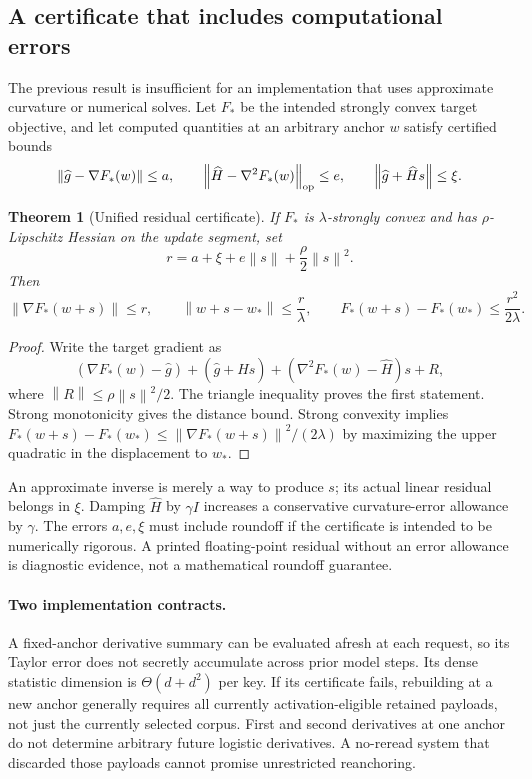 \documentclass[11pt,a4paper]{article}
\newtheorem{theorem}{Theorem}[section]
\theoremstyle{definition}\newtheorem{definition}[theorem]{Definition}
\newcommand{\norm}[1]{\left\lVert #1\right\rVert}
\begin{document}
\subsection{A certificate that includes computational errors}
The previous result is insufficient for an implementation that uses approximate curvature or numerical solves. Let $F_*$ be the intended strongly convex target objective, and let computed quantities at an arbitrary anchor $w$ satisfy certified bounds
\[
 \norm{\widehat g-\nabla F_*(w)}\le a,\qquad
 \norm{\widehat H-\nabla^2F_*(w)}_{\rm op}\le e,\qquad
 \norm{\widehat g+\widehat Hs}\le\xi.
\]
\begin{theorem}[Unified residual certificate]\label{thm:residual}
If $F_*$ is $\lambda$-strongly convex and has $\rho$-Lipschitz Hessian on the update segment, set
\begin{equation}\label{eq:residual}
 r=a+\xi+e\norm{s}+\frac\rho2\norm{s}^2.
\end{equation}
Then
\[
 \norm{\nabla F_*(w+s)}\le r,\qquad
 \norm{w+s-w_*}\le\frac r\lambda,\qquad
 F_*(w+s)-F_*(w_*)\le\frac{r^2}{2\lambda}.
\]
\end{theorem}
\begin{proof}
Write the target gradient as
\[
 (\nabla F_*(w)-\widehat g)+(\widehat g+\widehat Hs)
 +(\nabla^2F_*(w)-\widehat H)s+R,
\]
where $\norm R\le\rho\norm{s}^2/2$. The triangle inequality proves the first statement. Strong monotonicity gives the distance bound. Strong convexity implies
$F_*(w+s)-F_*(w_*)\le\norm{\nabla F_*(w+s)}^2/(2\lambda)$ by maximizing the upper quadratic in the displacement to $w_*$.
\end{proof}
An approximate inverse is merely a way to produce $s$; its actual linear residual belongs in $\xi$. Damping $\widehat H$ by $\gamma I$ increases a conservative curvature-error allowance by $\gamma$. The errors $a,e,\xi$ must include roundoff if the certificate is intended to be numerically rigorous. A printed floating-point residual without an error allowance is diagnostic evidence, not a mathematical roundoff guarantee.

\paragraph{Two implementation contracts.} A fixed-anchor derivative summary can be evaluated afresh at each request, so its Taylor error does not secretly accumulate across prior model steps. Its dense statistic dimension is $\Theta(d+d^2)$ per key. If its certificate fails, rebuilding at a new anchor generally requires all currently activation-eligible retained payloads, not just the currently selected corpus. First and second derivatives at one anchor do not determine arbitrary future logistic derivatives. A no-reread system that discarded those payloads cannot promise unrestricted reanchoring.
\end{document}

